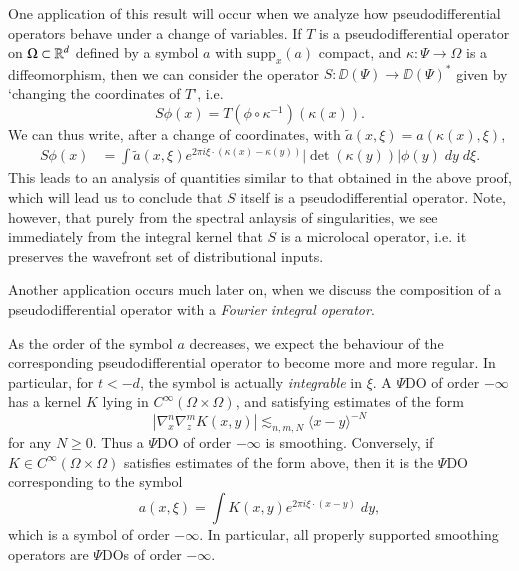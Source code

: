 \begin{remark}
    One application of this result will occur when we analyze how pseudodifferential operators behave under a change of variables. If $T$ is a pseudodifferential operator on $\Omega \subset \operatorname{\mathbb{R}}^d$ defined by a symbol $a$ with $\text{supp}_x(a)$ compact, and $\kappa: \Psi \to \Omega$ is a diffeomorphism, then we can consider the operator $S: \DD(\Psi) \to \DD(\Psi)^*$ given by `changing the coordinates of $T$', i.e.
    \[ S\phi(x) = T(\phi \circ \kappa^{-1})(\kappa(x)). \]
    We can thus write, after a change of coordinates, with $\tilde{a}(x,\xi) = a(\kappa(x),\xi)$,
    \begin{align*}
        S\phi(x) &= \int \tilde{a}(x,\xi) e^{2 \pi i \xi \cdot (\kappa(x) - \kappa(y))} |\det(\kappa(y))| \phi(y)\; dy\; d\xi.
    \end{align*}
    This leads to an analysis of quantities similar to that obtained in the above proof, which will lead us to conclude that $S$ itself is a pseudodifferential operator. Note, however, that purely from the spectral anlaysis of singularities, we see immediately from the integral kernel that $S$ is a microlocal operator, i.e. it preserves the wavefront set of distributional inputs.

    Another application occurs much later on, when we discuss the composition of a pseudodifferential operator with a \emph{Fourier integral operator}.
\end{remark}

As the order of the symbol $a$ decreases, we expect the behaviour of the corresponding pseudodifferential operator to become more and more regular. In particular, for $t < - d$, the symbol is actually \emph{integrable} in $\xi$. A $\Psi$DO of order $-\infty$ has a kernel $K$ lying in $C^\infty(\Omega \times \Omega)$, and satisfying estimates of the form
%
\[ | \nabla^n_x \nabla^m_z K(x,y)| \lesssim_{n,m,N} \langle x-y \rangle^{-N} \]
%
for any $N \geq 0$. Thus a $\Psi$DO of order $-\infty$ is smoothing. Conversely, if $K \in C^\infty(\Omega \times \Omega)$ satisfies estimates of the form above, then it is the $\Psi$DO corresponding to the symbol
%
\[ a(x,\xi) = \int K(x,y) e^{2 \pi i \xi \cdot (x-y)}\; dy, \]
%
which is a symbol of order $-\infty$. In particular, all properly supported smoothing operators are $\Psi$DOs of order $-\infty$.

